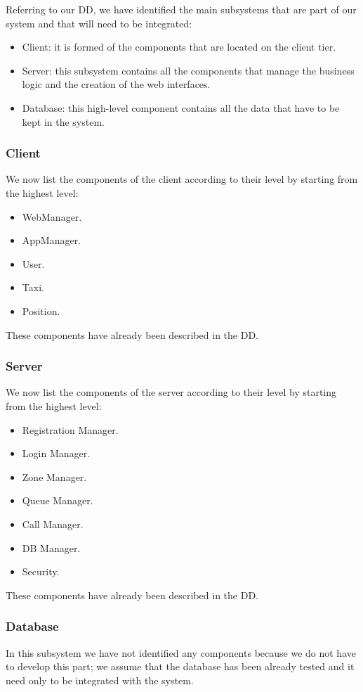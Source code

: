 Referring to our DD, we have identified the main subsystems that are part of our system and that will need to be integrated:
\begin{itemize}
    \item Client: it is formed of the components that are located on the client tier.
    \item Server: this subsystem contains all the components that manage the business logic and the creation of the web interfaces.
    \item Database: this high-level component contains all the data that have to be kept in the system.
\end{itemize}


\subsubsection{Client}
We now list the components of the client according to their level by starting from the highest level:
\begin{itemize}
    \item WebManager. 
    \item AppManager.
    \item User.
    \item Taxi.
    \item Position.
\end{itemize}
These components have already been described in the DD.

\subsubsection{Server}
We now list the components of the server according to their level by starting from the highest level:
\begin{itemize}
    \item Registration Manager.
    \item Login Manager.
    \item Zone Manager.
    \item Queue Manager.
    \item Call Manager.
    \item DB Manager.
    \item Security.
\end{itemize}
These components have already been described in the DD.

\subsubsection{Database}
In this subsystem we have not identified any components because we do not have to develop this part; we assume that the database has been already tested and it need only to be integrated with the system.





